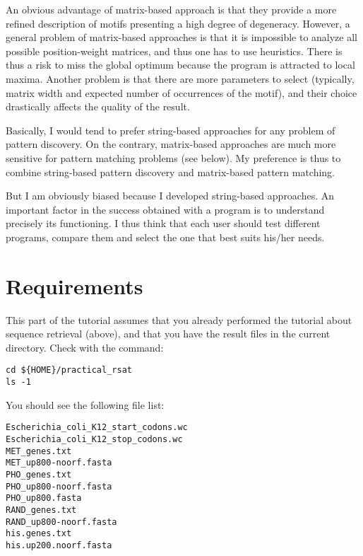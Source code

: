 An obvious advantage of matrix-based approach is that they provide a
more refined description of motifs presenting a high degree of
degeneracy. However, a general problem of matrix-based approaches is
that it is impossible to analyze all possible position-weight
matrices, and thus one has to use heuristics. There is thus a risk to
miss the global optimum because the program is attracted to local
maxima. Another problem is that there are more parameters to select
(typically, matrix width and expected number of occurrences of the
motif), and their choice drastically affects the quality of the
result.

Basically, I would tend to prefer string-based approaches for any
problem of pattern discovery. On the contrary, matrix-based approaches
are much more sensitive for pattern matching problems (see below). My
preference is thus to combine string-based pattern discovery and
matrix-based pattern matching.

But I am obviously biased because I developed string-based
approaches. An important factor in the success obtained with a program
is to understand precisely its functioning. I thus think that each
user should test different programs, compare them and select the one
that best suits his/her needs.

\section{Requirements}

This part of the tutorial assumes that you already performed the
tutorial about sequence retrieval (above), and that you have the
result files in the current directory. Check with the command:

{\color{Blue} \begin{footnotesize} 
\begin{verbatim}
cd ${HOME}/practical_rsat
ls -1
\end{verbatim} \end{footnotesize}
}


You should see the following file list:
{\color{Blue} \begin{footnotesize} 
\begin{verbatim}
Escherichia_coli_K12_start_codons.wc
Escherichia_coli_K12_stop_codons.wc
MET_genes.txt
MET_up800-noorf.fasta
PHO_genes.txt
PHO_up800-noorf.fasta
PHO_up800.fasta
RAND_genes.txt
RAND_up800-noorf.fasta
his.genes.txt
his.up200.noorf.fasta
\end{verbatim} \end{footnotesize}
}

